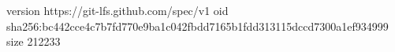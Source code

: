 version https://git-lfs.github.com/spec/v1
oid sha256:bc442cce4c7b7fd770e9ba1c042fbdd7165b1fdd313115dccd7300a1ef934999
size 212233
